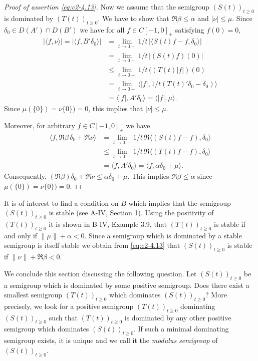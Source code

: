 \begin{proof}[Proof of assertion \eqref{eq:c2-4.13}]
Now we assume that the semigroup $(S(t))_{t \geq 0}$ is dominated by $(T(t))_{t \geq 0}$.
We have to show that $\Re\beta \leq \alpha$ and $|\nu| \leq \mu$.
Since $\delta_{0} \in D(A') \cap D(B')$ we have for all $f \in C[-1,0]_{+}$ satisfying $f(0) = 0$,
\begin{align*}
|\langle f,\nu\rangle| = |\langle f,B'\delta_{0}\rangle| &= \lim_{t \to 0+} 1/t \, |\langle S(t)f - f , \delta_{0}\rangle|\\
&= \lim_{t \to 0+} 1/t \, |(S(t)f)(0)|  \\
&\leq \lim_{t \to 0+} 1/t \, ((T(t)|f|)(0) \\
&= \lim_{t \to 0+} \langle|f|,1/t(T(t)'\delta_{0} - \delta_{0})\rangle \\
&= \langle|f|,A'\delta_{0}\rangle = \langle|f|,\mu\rangle.
\end{align*}
Since $\mu(\{0\}) = \nu\{0\}) = 0$, this implies that $|\nu| \leq \mu$.

Moreover, for arbitrary $f \in C[-1,0]_{+}$ we have
\begin{align*}
\langle f,\Re\beta \, \delta_{0} + \Re\nu\rangle &= \lim_{t \to 0+} 1/t \, \Re\langle(S(t)f - f),\delta_{0}\rangle\\
&\leq \lim_{t \to 0+} 1/t \, \Re\langle(T(t)f - f),\delta_{0}\rangle \\
&= \langle f,A'\delta_{0}\rangle = \langle f,\alpha\delta_{0} + \mu\rangle.
\end{align*}
Consequently, $(\Re\beta)\delta_{0} + \Re\nu \leq \alpha\delta_{0} + \mu$.
This implies $\Re\beta \leq \alpha$ since $\mu(\{0\}) = \nu\{0\}) = 0$.
\end{proof}
\begin{remark*}
	It is of interest to find a condition on $B$ which implies that the semigroup $(S(t))_{t \geq 0}$ is stable (see A-IV, Section 1).
	Using the positivity of $(T(t))_{t \geq 0}$ it is shown in B-IV, Example 3.9, that
	$(T(t))_{t \geq 0}$ is stable if and only if $\|\mu\| + \alpha < 0$.
	Since a semigroup which is dominated by a stable semigroup is itself stable we obtain from \eqref{eq:c2-4.13} that $(S(t))_{t \geq 0}$ is stable if $\|\nu\| + \Re\beta < 0$.
\end{remark*}
We conclude this section discussing the following question.
Let $(S(t))_{t \geq 0}$ be a semigroup which is dominated by some positive semigroup.
Does there exist a smallest semigroup $(T(t))_{t \geq 0}$ which dominates $(S(t))_{t \geq 0}$?
More precisely, we look for a positive semigroup $(T(t))_{t \geq 0}$ dominating $(S(t))_{t \geq 0}$ such that $(T(t))_{t \geq 0}$ is dominated
by any other positive semigroup which dominates $(S(t))_{t \geq 0}$.
If such a minimal dominating semigroup exists, it is unique and we call it the
\emph{modulus semigroup} of $(S(t))_{t \geq 0}$.

